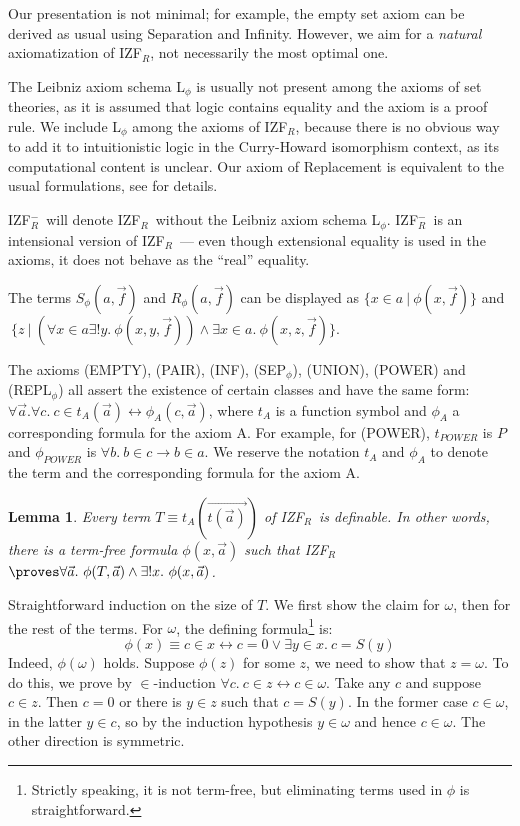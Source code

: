 \documentclass{LMCS}
\newtheorem{lemma}[thm]{Lemma}
\newcommand\iffl{\ensuremath{\leftrightarrow}}
\newcommand{\p}{\proves}
\newcommand{\izfr}{IZF${}_R$}
\newcommand{\iizfr}{IZF${}_R^{-}$}
\begin{document}
Our presentation is not minimal; for example, the empty set axiom can be
derived as usual using Separation and Infinity. However, we aim for a
\emph{natural} axiomatization of \izfr, not necessarily the most optimal one. 

The Leibniz axiom schema L${}_\phi$ is usually not present among the axioms of set
theories, as it is assumed that logic contains equality and the axiom is 
a proof rule. We include L${}_\phi$ among the axioms of \izfr, because
there is no obvious way to add it to intuitionistic logic in the Curry-Howard isomorphism context,
as its computational content is unclear. Our axiom of Replacement is
equivalent to the usual formulations, see \cite{jatrinac2006} for details.

\iizfr\ will denote \izfr\  without the Leibniz axiom schema L${}_\phi$. \iizfr\ is
an intensional version of \izfr\  --- even though extensional equality is used
in the axioms, it does not behave as the ``real'' equality. 

The terms $S_\phi(a, \vec{f})$ and $R_\phi(a, \vec{f})$ can be displayed
as $\{ x \in a\ |\ \phi(x, \vec{f}) \}$ and $\ \{ z\ |\ (\forall x \in a
\exists !y.\ \phi(x, y, \vec{f})) \land \exists x \in a.\ \phi(x, z, \vec{f}) \}$.

The axioms (EMPTY), (PAIR), (INF), (SEP${}_{\phi}$), (UNION), (POWER) and (REPL$_{\phi}$)
all assert the existence of certain classes and have the same form: $\forall 
\vec{a}. \forall c.\ c \in t_A(\vec{a}) \iffl \phi_A(c, \vec{a})$, where $t_A$ is a 
function symbol and $\phi_A$ a corresponding formula
for the axiom A. For example, for (POWER), $t_{\mathit{POWER}}$ is $P$ and
$\phi_{\mathit{POWER}}$ is $\forall b.\ b \in c
\to b \in a$. We reserve the notation $t_A$ and $\phi_A$ to denote the term and
the corresponding formula for the axiom A.

\begin{lemma}\label{tdef0}
Every term $T \equiv t_A(\overrightarrow{t(\vec{a})})$ of \izfr\ is definable. In
other words, there is a term-free formula $\phi(x,\vec{a})$ such that \izfr 
$\p \forall \vec{a}.\ \phi(T, \vec{a}) \land \exists !x.\ \phi(x, \vec{a})$.
\end{lemma}
\proof Straightforward induction on the size of $T$.
We first show the claim for $\omega$, then for the rest of the terms. For $\omega$, the defining
formula\footnote{Strictly speaking, it is not term-free, but eliminating
terms used in $\phi$ is straightforward.} is:
\[
\phi(x) \equiv c \in x \iffl c = 0 \lor \exists y \in x.\ c = S(y)
\]
Indeed, $\phi(\omega)$ holds. Suppose $\phi(z)$ for some
$z$, we need to show that $z = \omega$. To do this, we prove by
$\in$-induction $\forall c.\ c \in z \iffl c \in \omega$. Take any $c$ and 
suppose $c \in z$. Then $c = 0$ or there is $y \in z$ such that $c = S(y)$.
In the former case $c \in \omega$, in the latter $y \in c$, so by the
induction hypothesis $y \in \omega$ and hence $c \in \omega$. The other
direction is symmetric. 
\end{document}
